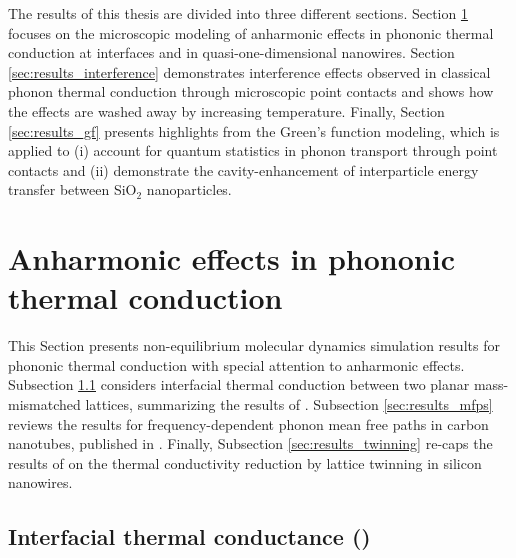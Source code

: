 
The results of this thesis are divided into three different sections. Section \ref{sec:results_anharm} focuses on the microscopic modeling of anharmonic effects in phononic thermal conduction at interfaces and in quasi-one-dimensional nanowires. Section \ref{sec:results_interference} demonstrates interference effects observed in classical phonon thermal conduction through microscopic point contacts and shows how the effects are washed away by increasing temperature. Finally, Section \ref{sec:results_gf} presents highlights from the Green's function modeling, which is applied to (i) account for quantum statistics in phonon transport through point contacts and (ii) demonstrate the cavity-enhancement of interparticle energy transfer between SiO$_2$ nanoparticles.

\section{Anharmonic effects in phononic thermal conduction}
\label{sec:results_anharm}

This Section presents non-equilibrium molecular dynamics simulation results for phononic thermal conduction with special attention to anharmonic effects. Subsection \ref{sec:results_interface} considers interfacial thermal conduction between two planar mass-mismatched lattices, summarizing the results of . Subsection \ref{sec:results_mfps} reviews the results for frequency-dependent phonon mean free paths in carbon nanotubes, published in . Finally, Subsection \ref{sec:results_twinning} re-caps the results of  on the thermal conductivity reduction by lattice twinning in silicon nanowires.

\subsection{Interfacial thermal conductance ()}
\label{sec:results_interface}

